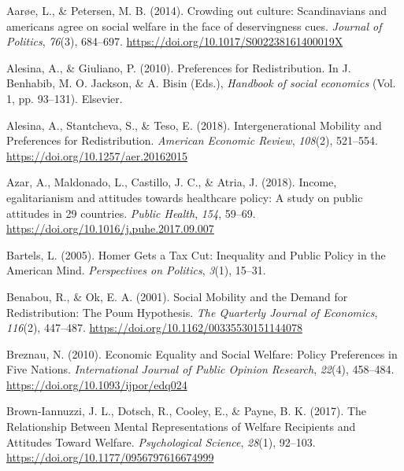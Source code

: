 \documentclass[
  12pt,
]{book}
\newlength{\cslhangindent}
\newenvironment{cslreferences}%
  {\setlength{\parindent}{0pt}%
  \everypar{\setlength{\hangindent}{\cslhangindent}}\ignorespaces}%
  {\par}
\begin{document}
\hypertarget{refs}{}
\begin{cslreferences}
\leavevmode\hypertarget{ref-Aaroe2014}{}%
Aarøe, L., \& Petersen, M. B. (2014). Crowding out culture: Scandinavians and americans agree on social welfare in the face of deservingness cues. \emph{Journal of Politics}, \emph{76}(3), 684--697. \url{https://doi.org/10.1017/S002238161400019X}

\leavevmode\hypertarget{ref-alesina_preferences_2010}{}%
Alesina, A., \& Giuliano, P. (2010). Preferences for Redistribution. In J. Benhabib, M. O. Jackson, \& A. Bisin (Eds.), \emph{Handbook of social economics} (Vol. 1, pp. 93--131). Elsevier.

\leavevmode\hypertarget{ref-alesina_intergenerational_2018}{}%
Alesina, A., Stantcheva, S., \& Teso, E. (2018). Intergenerational Mobility and Preferences for Redistribution. \emph{American Economic Review}, \emph{108}(2), 521--554. \url{https://doi.org/10.1257/aer.20162015}

\leavevmode\hypertarget{ref-Azaretal2018}{}%
Azar, A., Maldonado, L., Castillo, J. C., \& Atria, J. (2018). Income, egalitarianism and attitudes towards healthcare policy: A study on public attitudes in 29 countries. \emph{Public Health}, \emph{154}, 59--69. \url{https://doi.org/10.1016/j.puhe.2017.09.007}

\leavevmode\hypertarget{ref-bartels_homer_2005}{}%
Bartels, L. (2005). Homer Gets a Tax Cut: Inequality and Public Policy in the American Mind. \emph{Perspectives on Politics}, \emph{3}(1), 15--31.

\leavevmode\hypertarget{ref-benabou_social_2001}{}%
Benabou, R., \& Ok, E. A. (2001). Social Mobility and the Demand for Redistribution: The Poum Hypothesis. \emph{The Quarterly Journal of Economics}, \emph{116}(2), 447--487. \url{https://doi.org/10.1162/00335530151144078}

\leavevmode\hypertarget{ref-breznau_economic_2010}{}%
Breznau, N. (2010). Economic Equality and Social Welfare: Policy Preferences in Five Nations. \emph{International Journal of Public Opinion Research}, \emph{22}(4), 458--484. \url{https://doi.org/10.1093/ijpor/edq024}

\leavevmode\hypertarget{ref-brown-iannuzzi_relationship_2017}{}%
Brown-Iannuzzi, J. L., Dotsch, R., Cooley, E., \& Payne, B. K. (2017). The Relationship Between Mental Representations of Welfare Recipients and Attitudes Toward Welfare. \emph{Psychological Science}, \emph{28}(1), 92--103. \url{https://doi.org/10.1177/0956797616674999}


\end{cslreferences}
\end{document}
